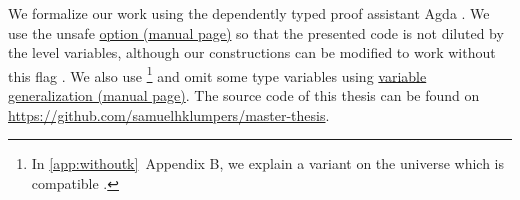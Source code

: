 We formalize our work using the dependently typed proof assistant Agda \cite{agda}. We use the unsafe \href{https://agda.readthedocs.io/en/latest/language/universe-levels.html}{ option (manual page)} so that the presented code is not diluted by the level variables, although our constructions can be modified to work without this flag \cite{practgen}. We also use \footnote{In \ref{app:withoutk}~Appendix B, we explain a variant on the universe which is compatible .} and omit some type variables using \href{https://agda.readthedocs.io/en/v2.6.4.1/language/generalization-of-declared-variables.html}{variable generalization (manual page)}. The source code of this thesis can be found on \url{https://github.com/samuelhklumpers/master-thesis}.